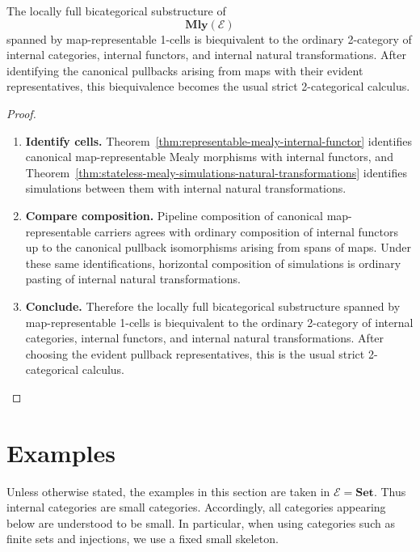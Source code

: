 \begin{corollary}
\label{cor:functorial-sub-bicategory}
    The locally full bicategorical substructure of
    \[
        \mathbf{Mly}(\mathcal E)
    \]
    spanned by map-representable 1-cells is biequivalent to the ordinary 2-category of internal categories, internal functors, and internal natural transformations. After identifying the canonical pullbacks arising from maps with their evident representatives, this biequivalence becomes the usual strict 2-categorical calculus.
\end{corollary}
\begin{proof}
    \leavevmode
    \begin{enumerate}
        \item \textbf{Identify cells.} Theorem~\ref{thm:representable-mealy-internal-functor} identifies canonical map-representable Mealy morphisms with internal functors, and Theorem~\ref{thm:stateless-mealy-simulations-natural-transformations} identifies simulations between them with internal natural transformations.

        \item \textbf{Compare composition.} Pipeline composition of canonical map-representable carriers agrees with ordinary composition of internal functors up to the canonical pullback isomorphisms arising from spans of maps. Under these same identifications, horizontal composition of simulations is ordinary pasting of internal natural transformations.

        \item \textbf{Conclude.} Therefore the locally full bicategorical substructure spanned by map-representable 1-cells is biequivalent to the ordinary 2-category of internal categories, internal functors, and internal natural transformations. After choosing the evident pullback representatives, this is the usual strict 2-categorical calculus.
    \end{enumerate}
\end{proof}

\section{Examples}
\label{sec:examples-mealy-morphisms}

Unless otherwise stated, the examples in this section are taken in \(\mathcal E=\mathbf{Set}\). Thus internal categories are small categories. Accordingly, all categories appearing below are understood to be small. In particular, when using categories such as finite sets and injections, we use a fixed small skeleton.

